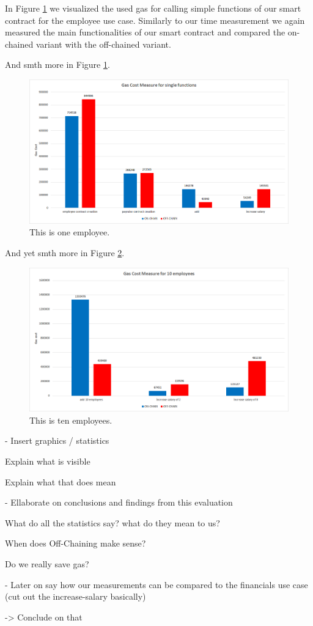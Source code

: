 In Figure \ref{fig:05_gas_cost_single} we visualized the used gas for calling simple functions of our smart contract for the employee use case. Similarly to our time measurement we again measured the main functionalities of our smart contract and compared the on-chained variant with the off-chained variant.

And smth more in Figure \ref{fig:05_gas_cost_single}.

\begin{figure}[hp]
\centering
\includegraphics[width=1.0\textwidth]{images/05_gas_cost_single.png}
\caption{\label{fig:05_gas_cost_single}This is one employee.}
\end{figure}

And yet smth more in Figure \ref{fig:05_gas_cost_ten}.

\begin{figure}[hp]
\centering
\includegraphics[width=1.0\textwidth]{images/05_gas_cost_ten.png}
\caption{\label{fig:05_gas_cost_ten}This is ten employees.}
\end{figure}



- Insert graphics / statistics

Explain what is visible

Explain what that does mean

- Ellaborate on conclusions and findings from this evaluation

What do all the statistics say? what do they mean to us?

When does Off-Chaining make sense?

Do we really save gas?

- Later on say how our measurements can be compared to the financials use case (cut out the increase-salary basically)

-> Conclude on that
